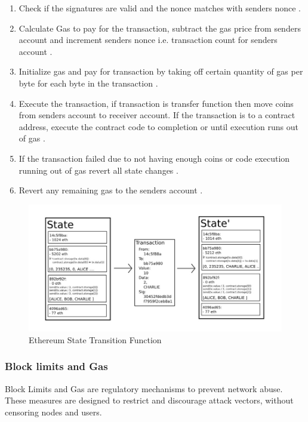 \begin{enumerate}
\item Check if the signatures are valid and the nonce matches with senders nonce \cite{eth:001}.
\item Calculate Gas to pay for the transaction, subtract the gas price from senders account and increment senders nonce i.e. transaction count for senders account \cite{eth:001}.
\item Initialize gas and pay for transaction by taking off certain quantity of gas per byte for each byte in the transaction \cite{eth:001}.
\item Execute the transaction, if transaction is transfer function then move coins from senders account to receiver account. If the transaction is to a contract address, execute the contract code to completion or until execution runs out of gas \cite{eth:001}.
\item If the transaction failed due to not having enough coins or code execution running out of gas revert all state changes \cite{eth:001}.
\item Revert any remaining gas to the senders account \cite{eth:001}.
\end{enumerate}

\begin{figure}[h]
	\centering
    \includegraphics[width=180mm,scale=1]{figs/ethstf}
	\caption{Ethereum State Transition Function \cite{eth:001}}
	\label{fig:EthSTF}
\end{figure}
\clearpage
\subsubsection{Block limits and Gas}
Block Limits and Gas are regulatory mechanisms to prevent network abuse. These measures are designed to restrict and discourage attack vectors, without censoring nodes and users. 
 
